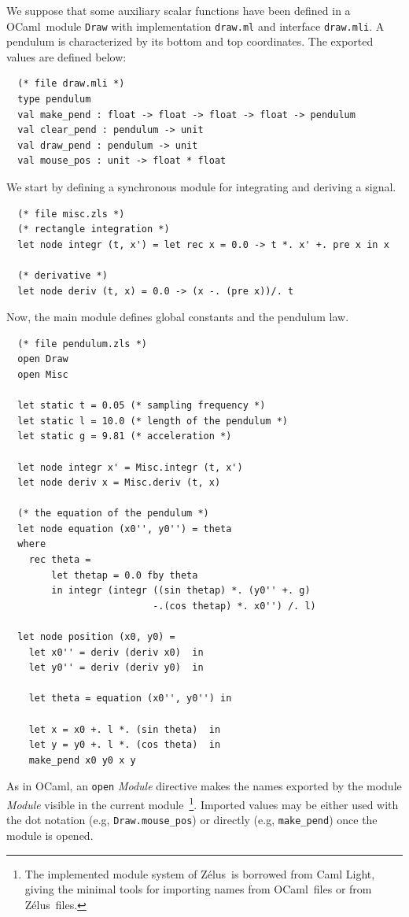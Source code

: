 \documentclass[11pt,titlepage,twoside]{report}
\newcommand{\zelus}{{\sf Z\'elus}}
\newcommand{\camllight}{{\sf Caml Light}}
\newcommand{\ocaml}{{\sf OCaml}}
\begin{document}
We suppose that some auxiliary scalar functions have been defined
in a \ocaml\ module \verb-Draw- with implementation \verb-draw.ml- and
interface \verb-draw.mli-. A pendulum is characterized by its
bottom and top coordinates. The exported values are defined below:

\begin{verbatim}
  (* file draw.mli *)
  type pendulum
  val make_pend : float -> float -> float -> float -> pendulum
  val clear_pend : pendulum -> unit
  val draw_pend : pendulum -> unit
  val mouse_pos : unit -> float * float
\end{verbatim}

\noindent
We start by defining a synchronous module for integrating and deriving
a signal.

\begin{verbatim}
  (* file misc.zls *)
  (* rectangle integration *)
  let node integr (t, x') = let rec x = 0.0 -> t *. x' +. pre x in x

  (* derivative *)
  let node deriv (t, x) = 0.0 -> (x -. (pre x))/. t
\end{verbatim}

\noindent Now, the main module defines global constants and the
pendulum law.

\begin{verbatim}
  (* file pendulum.zls *)
  open Draw
  open Misc

  let static t = 0.05 (* sampling frequency *)
  let static l = 10.0 (* length of the pendulum *)
  let static g = 9.81 (* acceleration *)

  let node integr x' = Misc.integr (t, x')
  let node deriv x = Misc.deriv (t, x)

  (* the equation of the pendulum *)
  let node equation (x0'', y0'') = theta
  where 
    rec theta =
        let thetap = 0.0 fby theta
        in integr (integr ((sin thetap) *. (y0'' +. g)
                          -.(cos thetap) *. x0'') /. l)

  let node position (x0, y0) = 
    let x0'' = deriv (deriv x0)  in
    let y0'' = deriv (deriv y0)  in

    let theta = equation (x0'', y0'') in

    let x = x0 +. l *. (sin theta)  in
    let y = y0 +. l *. (cos theta)  in
    make_pend x0 y0 x y
\end{verbatim}
As in \ocaml, an \verb-open- {\em Module} directive makes the names
exported by the module {\em Module} visible in the current
module~\footnote{The implemented module system of \zelus\ is borrowed
from \camllight, giving the minimal tools for importing names
from \ocaml\ files or from \zelus\ files.}. Imported values may be
either used with the dot notation (e.g, \verb-Draw.mouse_pos-) or
directly (e.g, \verb-make_pend-) once the module is opened.
\end{document}
